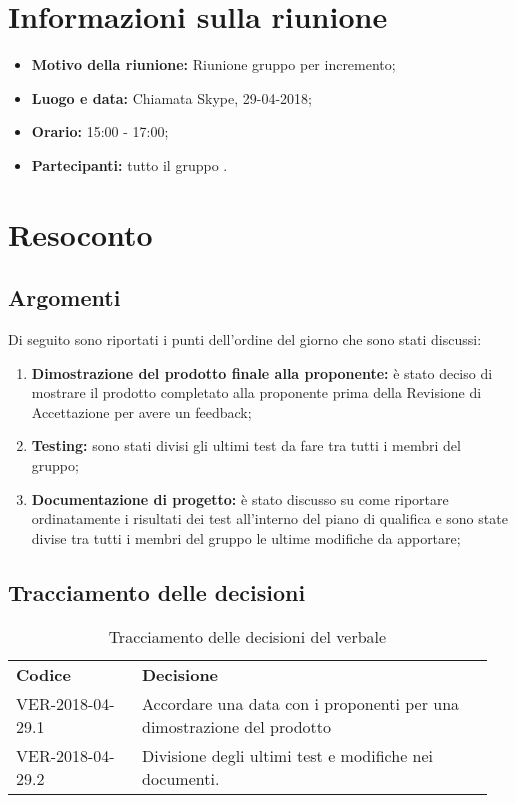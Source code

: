 \documentclass[VER-2018-04-29.tex]{subfiles}
\begin{document}
	

\chapter{Informazioni sulla riunione}
\begin{itemize}
	\item \textbf{Motivo della riunione:} Riunione gruppo per incremento;
	\item \textbf{Luogo e data:} Chiamata Skype, 29-04-2018;
	\item \textbf{Orario:} 15:00 - 17:00;
	\item \textbf{Partecipanti:} tutto il gruppo \gruppo.
\end{itemize}



\chapter{Resoconto}
\section{Argomenti}
Di seguito sono riportati i punti dell'ordine del giorno che sono stati discussi:
\begin{enumerate}
	\item \textbf{Dimostrazione del prodotto finale alla proponente:} è stato deciso di mostrare il prodotto completato alla proponente prima della Revisione di Accettazione per avere un feedback;
	\item \textbf{Testing:} sono stati divisi gli ultimi test da fare tra tutti i membri del gruppo;
	\item \textbf{Documentazione di progetto:} è stato discusso su come riportare ordinatamente i risultati dei test all'interno del piano di qualifica e sono state divise tra tutti i membri del gruppo le ultime modifiche da apportare;
\end{enumerate}
\section{Tracciamento delle decisioni}
\begin{table}[H]
	\begin{center}
		\begin{tabu} to 
			\tableHeaderStyle
			\textbf{Codice} & \textbf{Decisione} \\
			VER-2018-04-29.1 & Accordare una data con i proponenti per una dimostrazione del prodotto \\
			VER-2018-04-29.2 & Divisione degli ultimi test e modifiche nei documenti. \\
		\end{tabu}
		\caption{Tracciamento delle decisioni del verbale}
	\end{center}
\end{table}
\end{document}

